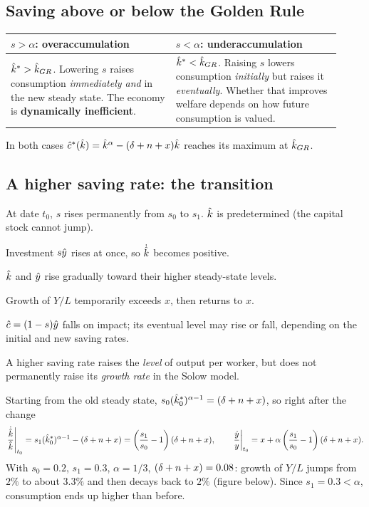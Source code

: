 \documentclass[11pt]{article}
\begin{document}
\subsection{Saving above or below the Golden Rule}
\begin{center}
\renewcommand{\arraystretch}{1.3}
\begin{tabular}{@{}p{0.46\linewidth}@{\qquad}p{0.46\linewidth}@{}}
\toprule
$s > \alpha$: \textbf{overaccumulation} & $s < \alpha$: \textbf{underaccumulation} \\
\midrule
$\hat{k}^* > \hat{k}_{GR}$. Lowering $s$ raises consumption \emph{immediately and} in the new steady state. The economy is \textbf{dynamically inefficient}. &
$\hat{k}^* < \hat{k}_{GR}$. Raising $s$ lowers consumption \emph{initially} but raises it \emph{eventually}. Whether that improves welfare depends on how future consumption is valued. \\
\bottomrule
\end{tabular}
\end{center}
In both cases $\hat{c}^*(\hat{k}) = \hat{k}^{\alpha} - (\delta+n+x)\hat{k}$ reaches its maximum at $\hat{k}_{GR}$.

\subsection{A higher saving rate: the transition}
At date $t_0$, $s$ rises permanently from $s_0$ to $s_1$. $\hat{k}$ is predetermined (the capital stock cannot jump).
\begin{flatnum}
  \item Investment $s\hat{y}$ rises at once, so $\dot{\hat{k}}$ becomes positive.
  \item $\hat{k}$ and $\hat{y}$ rise gradually toward their higher steady-state levels.
  \item Growth of $Y/L$ temporarily exceeds $x$, then returns to $x$.
  \item $\hat{c} = (1-s)\hat{y}$ falls on impact; its eventual level may rise or fall, depending on the initial and new saving rates.
\end{flatnum}
\begin{keyresult}
A higher saving rate raises the \emph{level} of output per worker, but does not permanently raise its \emph{growth rate} in the Solow model.
\end{keyresult}

\begin{extra}
Starting from the old steady state, $s_0(\hat{k}_0^*)^{\alpha-1} = (\delta+n+x)$, so right after the change
\[
\left.\frac{\dot{\hat{k}}}{\hat{k}}\right|_{t_0} = s_1(\hat{k}_0^*)^{\alpha-1} - (\delta+n+x) = \left(\frac{s_1}{s_0} - 1\right)(\delta+n+x),
\qquad
\left.\frac{\dot{y}}{y}\right|_{t_0} = x + \alpha\left(\frac{s_1}{s_0} - 1\right)(\delta+n+x).
\]
With $s_0 = 0.2$, $s_1 = 0.3$, $\alpha = 1/3$, $(\delta+n+x) = 0.08$: growth of $Y/L$ jumps from $2\%$ to about $3.3\%$ and then decays back to $2\%$ (figure below). Since $s_1 = 0.3 < \alpha$, consumption ends up higher than before.
\end{extra}
\end{document}
